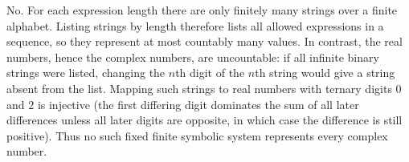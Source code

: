No. For each expression length there are only finitely many strings over a finite alphabet. Listing strings by length therefore lists all allowed expressions in a sequence, so they represent at most countably many values. In contrast, the real numbers, hence the complex numbers, are uncountable: if all infinite binary strings were listed, changing the $n$th digit of the $n$th string would give a string absent from the list. Mapping such strings to real numbers with ternary digits $0$ and $2$ is injective (the first differing digit dominates the sum of all later differences unless all later digits are opposite, in which case the difference is still positive). Thus no such fixed finite symbolic system represents every complex number.
